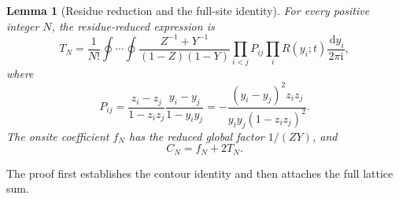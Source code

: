 \documentclass[11pt]{article}
\numberwithin{equation}{section}
\newtheorem{lemma}[theorem]{Lemma}
\theoremstyle{definition}
\newcommand{\dd}{\,\mathrm d}
\newcommand{\ii}{\mathrm i}
\begin{document}
\begin{lemma}[Residue reduction and the full-site identity]\label{lem:residue}
For every positive integer $N$, the residue-reduced expression is
\begin{equation}
 T_N=\frac1{N!}\oint\cdots\oint
 \frac{Z^{-1}+Y^{-1}}{(1-Z)(1-Y)}
 \prod_{i<j}P_{ij}\prod_i R(y_i;t)\frac{\dd y_i}{2\pi\ii},
 \label{eq:reduced}
\end{equation}
where
\begin{equation}
 P_{ij}=\frac{z_i-z_j}{1-z_iz_j}\frac{y_i-y_j}{1-y_iy_j}
 =-\frac{(y_i-y_j)^2z_iz_j}{y_iy_j(1-z_iz_j)^2}.
 \label{eq:pair}
\end{equation}
The onsite coefficient $f_N$ has the reduced global factor $1/(ZY)$,
and
\begin{equation}
 C_N=f_N+2T_N.\label{eq:onsiteidentity}
\end{equation}
\end{lemma}
The proof first establishes the contour identity and then attaches the
full lattice sum.
\end{document}
